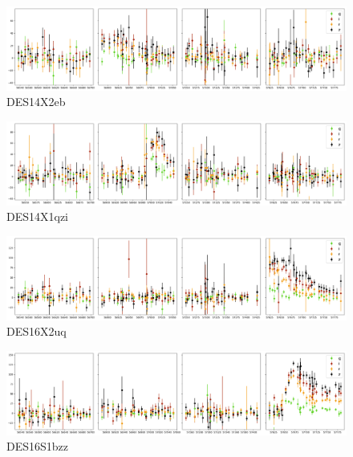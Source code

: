 
\begin{figure}[H]
  \centering
  \includegraphics[width=\textwidth]{Figures/Appendix/CNN/1291713.png}
  \caption{DES14X2eb}
\end{figure}

\begin{figure}[H]
  \centering
  \includegraphics[width=\textwidth]{Figures/Appendix/CNN/1316853.png}
  \caption{DES14X1qzi}
\end{figure}

\begin{figure}[H]
  \centering
  \includegraphics[width=\textwidth]{Figures/Appendix/CNN/1373034.png}
  \caption{DES16X2uq}
\end{figure}

\begin{figure}[H]
  \centering
  \includegraphics[width=\textwidth]{Figures/Appendix/CNN/1461053.png}
  \caption{DES16S1bzz}
\end{figure}


